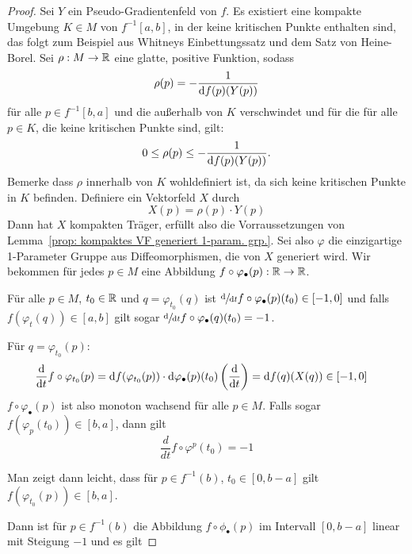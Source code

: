 \begin{proof}
    Sei $Y$ ein Pseudo-Gradientenfeld von $f$. Es existiert eine kompakte Umgebung $K \in M$ von 
    $f^{-1}[a, b]$, in der keine kritischen Punkte enthalten sind, das folgt zum Beispiel aus 
    Whitneys Einbettungssatz und dem Satz von Heine-Borel. Sei $\rho: M \to { \mathbb R }$ eine glatte, 
    positive Funktion, sodass
    \[ \rho(p) = - \frac{1}{{ \operatorname{d} } f (p) (Y (p))} \]
    für alle $p \in f^{-1}[b, a]$ und die außerhalb von $K$ verschwindet und für
    die für alle $p \in K$, die keine kritischen Punkte sind, gilt: 
    \[ 0 \leq \rho(p) \leq - \frac{1}{{ \operatorname{d} } f (p) (Y (p))} . \]
    Bemerke dass $\rho$ innerhalb von $K$ wohldefiniert ist, da sich keine kritischen Punkte in $K$ 
    befinden. Definiere ein Vektorfeld $X$ durch
    \[ X(p) = \rho(p) \cdot Y (p) \]
    Dann hat $X$ kompakten Träger, erfüllt also die Vorraussetzungen von 
    Lemma~\ref{prop: kompaktes VF generiert 1-param. grp.}. Sei also $\varphi$ die
    einzigartige 1-Parameter Gruppe aus Diffeomorphismen, die von $X$ generiert
    wird. 
    Wir bekommen für jedes $p \in M$ eine Abbildung 
    $f \circ \varphi_{\bullet}(p): { \mathbb R } \to { \mathbb R }$.
    
    \begin{claim*} 
        Für alle $p \in M$, $t_0 \in { \mathbb R }$ und $q = \varphi_{t_0}(q)$
        ist $\derive{t} f \circ \varphi_{\bullet}(p) (t_0) \in [-1, 0]$ und falls 
        $f(\varphi_t(q)) \in [a, b]$ gilt sogar $\derive{t} f \circ \varphi_{\bullet}(q) (t_0) = -1$.
    \end{claim*}

    \begin{smallproof}
        Für $q = \varphi_{t_0}(p)$:
        \begin{align*}
            \derive{t} f \circ \varphi_{t_0}(p)
            & = \opd f (\varphi_{t_0}(p)) \cdot \opd \varphi_{\bullet}(p) (t_0) 
                \left( \derive{t} \right)
            = \opd f (q) ( X(q) ) \in [-1, 0]
        \end{align*}
        $f \circ \varphi_{\bullet}(p)$ ist also monoton wachsend für alle $p \in M$.
        Falls sogar $f(\varphi_p(t_0)) \in [b, a]$, dann gilt
        \[ \frac{d}{dt} f \circ \varphi^p (t_0) = -1 \]
    \end{smallproof}

    Man zeigt dann leicht, dass für $p \in f^{-1}(b)$, $t_0 \in [0, b - a]$ gilt 
    $f(\varphi_{t_0}(p)) \in [b, a]$.

    Dann ist für $p \in f^{-1}(b)$ die Abbildung $f \circ \phi_{\bullet}(p)$ im Intervall $
    [0, b - a]$ linear mit Steigung $- 1$ und es gilt 


\end{proof}
